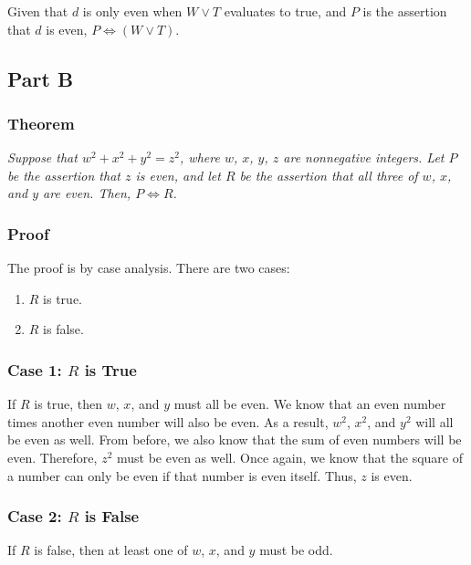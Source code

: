 \documentclass{article}
\begin{document}
Given that $d$ is only even when $W \lor T$ evaluates to true, and $P$ is the
assertion that $d$ is even, $ P \iff (W \lor T) $.

\subsection*{Part B}

\subsubsection*{Theorem}

\textit{Suppose that $w^{2} + x^{2} + y^{2} = z^{2}$, where $w$, $x$, $y$, $z$
are nonnegative integers. Let $P$ be the assertion that $z$ is even, and let $R$
be the assertion that all three of $w$, $x$, and $y$ are even. Then, $P \iff R$.}

\subsubsection*{Proof}

The proof is by case analysis. There are two cases:

\begin{enumerate}[\hspace{1cm}1.]
  \item $R$ is true.
  \item $R$ is false.
\end{enumerate}

\subsubsection*{Case 1: $R$ is True}

If $R$ is true, then $w$, $x$, and $y$ must all be even. We know that an even
number times another even number will also be even. As a result, $w^{2}$,
$x^{2}$, and $y^{2}$ will all be even as well. From before, we also know that
the sum of even numbers will be even. Therefore, $z^{2}$ must be even as well.
Once again, we know that the square of a number can only be even if that number
is even itself. Thus, $z$ is even.

\subsubsection*{Case 2: $R$ is False}

If $R$ is false, then at least one of $w$, $x$, and $y$ must be odd.
\end{document}
